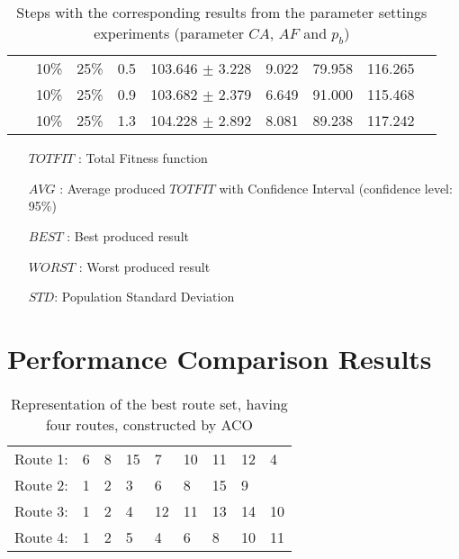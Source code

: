 \begin{table}
\begin{tabular}{|l|l|l|c||c|c|c|c|c|}
    ~ & 10\% & 25\% & 0.5 & 103.646 $\pm$ 3.228 & 9.022 & 79.958 & 116.265\\
    ~ & 10\% & 25\% & 0.9 & 103.682 $\pm$ 2.379 & 6.649 & 91.000 & 115.468\\
    ~ & 10\% & 25\% & 1.3 & 104.228 $\pm$ 2.892 & 8.081 & 89.238 & 117.242\\
    \hline
    \end{tabular}
    \caption {Steps with the corresponding results from the parameter settings experiments (parameter $CA$, $AF$ and $p_b$)}
    \tiny
    \begin{itemize}[noitemsep]
    \item[$TOTFIT$ :] Total Fitness function
    \item[$AVG$ :] Average produced $TOTFIT$ with Confidence Interval (confidence level: 95\%)
    \item[$BEST$ :] Best produced result
    \item[$WORST$ :] Worst produced result
    \item[$STD$:] Population Standard Deviation 
    \end{itemize}
    \label{table:pm2}
\end{table}


\section{Performance Comparison Results}
\begin{table}[H]
    \centering
    \begin{tabular}{|l|llllllll|}
    \hline
    Route 1: & 6 & 8 & 15 & 7 & 10 & 11 & 12 & 4 \\
    Route 2: & 1 & 2 & 3 & 6 & 8 & 15 & 9 &  \\
    Route 3: & 1 & 2 & 4 & 12 & 11 & 13 & 14 & 10 \\
    Route 4: & 1 & 2 & 5 & 4 & 6 & 8 & 10 & 11 \\
    \hline
    \end{tabular}
    \caption {Representation of the best route set, having four routes, constructed by ACO}
    \label{table:performanceComparison_bestRouteSet4_ACO}
\end{table}

